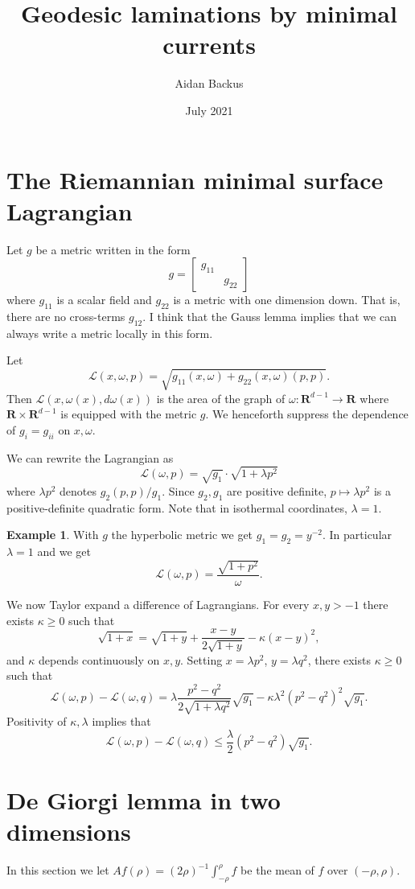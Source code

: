 \documentclass[reqno,12pt,letterpaper]{amsart}
\title[Geodesic laminations by minimal currents]{Geodesic laminations by minimal currents}
\author{Aidan Backus}
\date{July 2021}
\newcommand{\RR}{\mathbf{R}}
\newcommand{\Lagrange}{\mathscr L}
\theoremstyle{definition}
\newtheorem{example}[theorem]{Example}
\numberwithin{equation}{section}
\begin{document}


\section{The Riemannian minimal surface Lagrangian}
Let $g$ be a metric written in the form
$$g = \begin{bmatrix}g_{11} & \\ & g_{22}\end{bmatrix}$$
where $g_{11}$ is a scalar field and $g_{22}$ is a metric with one dimension down.
That is, there are no cross-terms $g_{12}$.
I think that the Gauss lemma implies that we can always write a metric locally in this form.

Let
$$\mathscr L(x, \omega, p) = \sqrt{g_{11}(x, \omega) + g_{22}(x, \omega)(p, p)}.$$
Then $\mathscr L(x, \omega(x), d\omega(x))$ is the area of the graph of $\omega: \RR^{d - 1} \to \RR$ where $\RR \times \RR^{d - 1}$ is equipped with the metric $g$.
We henceforth suppress the dependence of $g_i = g_{ii}$ on $x, \omega$.

We can rewrite the Lagrangian as
$$\mathscr L(\omega, p) = \sqrt{g_1} \cdot \sqrt{1 + \lambda p^2}$$
where $\lambda p^2$ denotes $g_2(p, p)/g_1$. Since $g_2,g_1$ are positive definite, $p \mapsto \lambda p^2$ is a positive-definite quadratic form.
Note that in isothermal coordinates, $\lambda = 1$.

\begin{example}
With $g$ the hyperbolic metric we get $g_1 = g_2 = y^{-2}$.
In particular $\lambda = 1$ and we get
$$\Lagrange(\omega, p) = \frac{\sqrt{1 + p^2}}{\omega}.$$
\end{example}

We now Taylor expand a difference of Lagrangians.
For every $x, y > -1$ there exists $\kappa \geq 0$ such that
$$\sqrt{1 + x} = \sqrt{1 + y} + \frac{x - y}{2\sqrt{1 + y}} - \kappa(x - y)^2,$$
and $\kappa$ depends continuously on $x,y$.
Setting $x = \lambda p^2$, $y = \lambda q^2$, there exists $\kappa \geq 0$ such that
$$\Lagrange(\omega, p) - \Lagrange(\omega, q) = \lambda \frac{p^2 - q^2}{2\sqrt{1 + \lambda q^2}} \sqrt{g_1} - \kappa \lambda^2 (p^2 - q^2)^2 \sqrt{g_1}.$$
Positivity of $\kappa,\lambda$ implies that
$$\Lagrange(\omega, p) - \Lagrange(\omega, q) \leq \frac{\lambda}{2}(p^2 - q^2) \sqrt{g_1}.$$


\section{De Giorgi lemma in two dimensions}
In this section we let $Af(\rho) = (2\rho)^{-1} \int_{-\rho}^\rho f$ be the mean of $f$ over $(-\rho, \rho)$.
\end{document}
